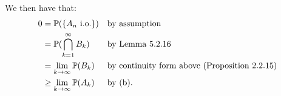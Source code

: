 We then have that:
\begin{align*}
	0 &= \mathbb P(\{A_n \text{ i.o.}\}) &&\text{by assumption} \\
	&= \mathbb P(\bigcap_{k =1}^\infty B_k) &&\text{by Lemma 5.2.16}\\
	&= \lim_{k \to \infty} \mathbb P(B_k) &&\text{by continuity form above (Proposition 2.2.15)}\\
	&\ge \lim_{k \to \infty} \mathbb P(A_k) &&\text{by (b)}.
\end{align*}
